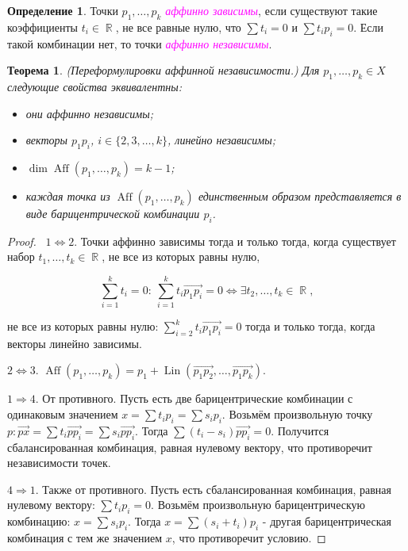 \documentclass[a4paper,100pt]{article}
\theoremstyle{indented}
\newtheorem{theorem}{Теорема}
\theoremstyle{definition}
\newtheorem{defn}{Определение}
\theoremstyle{remark}
\DeclareMathOperator{\Ra}{\Rightarrow}
\DeclareMathOperator{\RR}{\mathbb{R}}
\DeclareMathOperator{\Aff}{Aff}
\DeclareMathOperator{\Lin}{Lin}
\begin{document}
    

\begin{defn}
    Точки $p_1, \ldots, p_k$ \textit{\textcolor{magenta}{\hypertarget{s22}{аффинно зависимы}}}, если существуют такие коэффициенты $t_i \in \RR$, не все равные нулю, что $\sum t_i = 0$ и $\sum t_ip_i = 0$. Если такой комбинации нет, то точки \textit{\textcolor{magenta}{\hypertarget{s23}{аффинно независимы}}}.
\end{defn}

\begin{theorem}
    (Переформулировки аффинной независимости.) Для $p_1, \ldots, p_k \in X$ следующие свойства эквивалентны: 

    \begin{itemize}
        \item они аффинно независимы; 
        \item векторы $p_1 p_i$, $i\in \{2, 3, \ldots, k\}$, линейно независимы; 
        \item $\dim \Aff (p_1, \ldots, p_k)=k-1$; 
        \item каждая точка из $\Aff(p_1, \ldots, p_k)$ единственным образом представляется в виде барицентрической комбинации $p_i$. 
    \end{itemize}
\end{theorem}

\begin{proof} \ 
    $1 \Leftrightarrow 2$. Точки аффинно зависимы тогда и только тогда, когда существует набор $t_1, \ldots, t_k \in \RR$, не все из которых равны нулю,

    \[
        \sum_{i=1}^k t_i = 0: \: \sum_{i=1}^k t_i \vec{p_1 p_i} = 0 \Leftrightarrow \exists t_2, \ldots, t_k \in \RR,
    \]

    не все из которых равны нулю: $\sum_{i=2}^k t_i \vec{p_1 p_i} = 0$ тогда и только тогда, когда векторы линейно зависимы. \

    $2 \Leftrightarrow 3$. $\Aff(p_1, \ldots, p_k) = p_1 + \Lin(\vec{p_1 p_2}, \ldots, \vec{p_1 p_k})$. \ 

    $1 \Ra 4$. От противного. Пусть есть две барицентрические комбинации с одинаковым значением $x= \sum t_i p_i = \sum s_i p_i$. Возьмём произвольную точку $p: \vec{px} = \sum t_i \vec{pp_i} = \sum s_i \vec{pp_i}$. Тогда $\sum (t_i - s_i)\vec{pp_i} = 0$. Получится сбалансированная комбинация, равная нулевому вектору, что противоречит независимости точек. \ 

    $4 \Ra 1$. Также от противного. Пусть есть сбалансированная комбинация, равная нулевому вектору: $\sum t_i p_i = 0$. Возьмём произвольную барицентрическую комбинацию: $x = \sum s_i p_i$. Тогда $x = \sum (s_i + t_i)p_i$ - другая барицентрическая комбинация с тем же значением $x$, что противоречит условию.
\end{proof}
\end{document}
